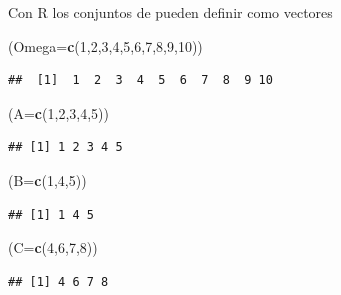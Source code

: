 \documentclass[]{book}
\newenvironment{Shaded}{\begin{snugshade}}{\end{snugshade}}
\newcommand{\DataTypeTok}[1]{\textcolor[rgb]{0.13,0.29,0.53}{#1}}
\newcommand{\DecValTok}[1]{\textcolor[rgb]{0.00,0.00,0.81}{#1}}
\newcommand{\KeywordTok}[1]{\textcolor[rgb]{0.13,0.29,0.53}{\textbf{#1}}}
\newcommand{\NormalTok}[1]{#1}
\begin{document}
Con R los conjuntos de pueden definir como vectores

\begin{Shaded}
\begin{Highlighting}[]
\NormalTok{(}\DataTypeTok{Omega=}\KeywordTok{c}\NormalTok{(}\DecValTok{1}\NormalTok{,}\DecValTok{2}\NormalTok{,}\DecValTok{3}\NormalTok{,}\DecValTok{4}\NormalTok{,}\DecValTok{5}\NormalTok{,}\DecValTok{6}\NormalTok{,}\DecValTok{7}\NormalTok{,}\DecValTok{8}\NormalTok{,}\DecValTok{9}\NormalTok{,}\DecValTok{10}\NormalTok{))}
\end{Highlighting}
\end{Shaded}

\begin{verbatim}
##  [1]  1  2  3  4  5  6  7  8  9 10
\end{verbatim}

\begin{Shaded}
\begin{Highlighting}[]
\NormalTok{(}\DataTypeTok{A=}\KeywordTok{c}\NormalTok{(}\DecValTok{1}\NormalTok{,}\DecValTok{2}\NormalTok{,}\DecValTok{3}\NormalTok{,}\DecValTok{4}\NormalTok{,}\DecValTok{5}\NormalTok{))}
\end{Highlighting}
\end{Shaded}

\begin{verbatim}
## [1] 1 2 3 4 5
\end{verbatim}

\begin{Shaded}
\begin{Highlighting}[]
\NormalTok{(}\DataTypeTok{B=}\KeywordTok{c}\NormalTok{(}\DecValTok{1}\NormalTok{,}\DecValTok{4}\NormalTok{,}\DecValTok{5}\NormalTok{))}
\end{Highlighting}
\end{Shaded}

\begin{verbatim}
## [1] 1 4 5
\end{verbatim}

\begin{Shaded}
\begin{Highlighting}[]
\NormalTok{(}\DataTypeTok{C=}\KeywordTok{c}\NormalTok{(}\DecValTok{4}\NormalTok{,}\DecValTok{6}\NormalTok{,}\DecValTok{7}\NormalTok{,}\DecValTok{8}\NormalTok{))}
\end{Highlighting}
\end{Shaded}

\begin{verbatim}
## [1] 4 6 7 8
\end{verbatim}
\end{document}
